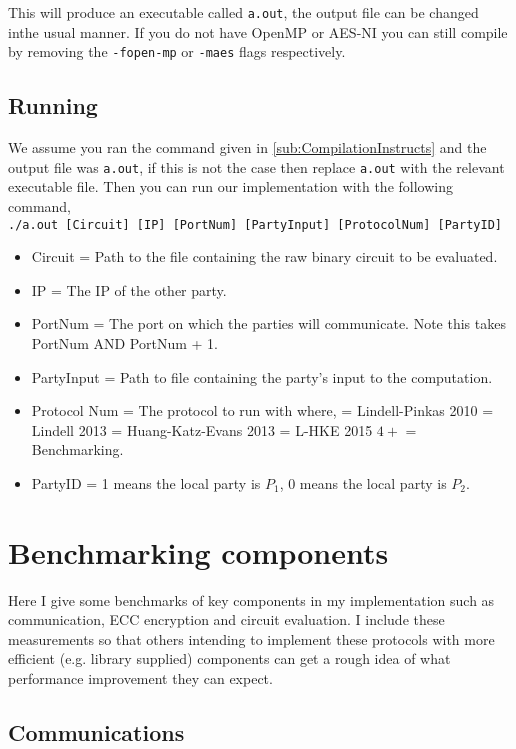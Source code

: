 \documentclass[ %
                    author={Nicholas Tutte},
                supervisor={Prof. Nigel Smart},
                    degree={MEng},
                     title={Secure Two Party Computation},
                  subtitle={A practical comparison of recent protocols},
                      type={Research - GG1K},
                      year={2015} ]{dissertation}
\begin{document}
\begin{appendices}
					This will produce an executable called \texttt{a.out}, the output file can be changed inthe usual manner. If you do not have OpenMP or AES-NI you can still compile by removing the \texttt{-fopen-mp} or \texttt{-maes} flags respectively.


			\section{Running}
				We assume you ran the command given in \ref{sub:CompilationInstructs} and the output file was \texttt{a.out}, if this is not the case then replace \texttt{a.out} with the relevant executable file. Then you can run our implementation with the following command,\\

				\texttt{./a.out [Circuit] [IP] [PortNum] [PartyInput] [ProtocolNum] [PartyID]}

				\begin{itemize}
					\item Circuit = Path to the file containing the raw binary circuit to be evaluated.
					\item IP = The IP of the other party.
					\item PortNum = The port on which the parties will communicate. Note this takes PortNum AND PortNum + 1.
					\item PartyInput = Path to file containing the party's input to the computation.
					\item Protocol Num = The protocol to run with where,
						 = Lindell-Pinkas 2010
						 = Lindell 2013
						 = Huang-Katz-Evans 2013
						 = L-HKE 2015
						\subitem $4+$ = Benchmarking.
					\item PartyID = 1 means the local party is $P_1$, 0 means the local party is $P_2$.
				\end{itemize}

		\chapter{Benchmarking components}
			Here I give some benchmarks of key components in my implementation such as communication, ECC encryption and circuit evaluation. I include these measurements so that others intending to implement these protocols with more efficient (e.g. library supplied) components can get a rough idea of what performance improvement they can expect.

			\section{Communications}


\end{appendices}
\end{document}

